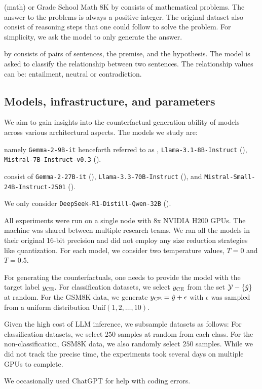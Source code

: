  (math) or Grade School Math 8K by \citet{cobbe2021gsm8k} consists of mathematical problems. The answer to the problems is always a positive integer. The original dataset also consist of reasoning steps that one could follow to solve the problem. For simplicity, we ask the model to only generate the answer.

 by \citet{N18-1101} consists of pairs of sentences, the premise, and the hypothesis. The model is asked to  classify the relationship between two sentences. The relationship values can be: entailment, neutral  or contradiction.



\subsection{Models, infrastructure, and parameters}
We aim to gain insights into the counterfactual generation ability of models across various architectural aspects. 
The models we study are:


 namely \texttt{Gemma-2-9B-it} henceforth referred to as \gemmaS, \texttt{Llama-3.1-8B-Instruct} (\llamaS),  \texttt{Mistral-7B-Instruct-v0.3} (\mistralS).  

 consist of \texttt{Gemma-2-27B-it} (\gemmaM), \texttt{Llama-3.3-70B-Instruct} (\llamaM), and \texttt{Mistral-Small-24B-Instruct-2501} (\mistralM).  

 We only consider \texttt{DeepSeek-R1-Distill-Qwen-32B} (\rd).  

All experiments were run on a single node with 8x NVIDIA H200 GPUs. The machine was shared between multiple research teams.
We ran all the models in their original 16-bit precision and did not employ any size reduction strategies like quantization.
For each model, we consider two temperature values, $T=0$ and $T=0.5$.

For generating the counterfactuals, one needs to provide the model with the target label $y_{\text{CE}}$. For classification datasets, we select $y_{\text{CE}}$ from the set $\mathcal{Y} - \{\hat{y}\}$ at random. For the GSM8K data, we generate $y_{\text{CE}} = \hat{y} +
\epsilon$ with $\epsilon$ was sampled from a uniform distribution
$\text{Unif}(1, 2, \ldots, 10)$.%

Given the high cost of LLM inference, we subsample datasets as follows: For classification datasets, we select $250$ samples at random from each class. For the non-classification, GSM8K data, we also randomly select $250$ samples.
While we did not track the precise time, the experiments took several days on multiple GPUs to complete.

We occasionally used ChatGPT for help with coding errors.
